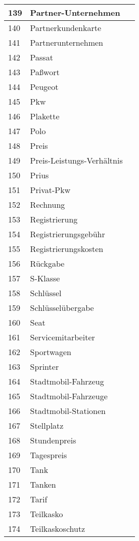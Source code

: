 \begin{longtable}{|m{1.5cm}|m{3cm}|m{8.5cm}|}
	\hline
	139 & Partner-Unternehmen & \\
	\hline
	140 & Partnerkundenkarte & \\
	\hline
	141 & Partnerunternehmen & \\
	\hline
	142 & Passat & \\
	\hline
	143 & Paßwort & \\
	\hline
	144 & Peugeot & \\
	\hline
	145 & Pkw & \\
	\hline
	146 & Plakette & \\
	\hline
	147 & Polo & \\
	\hline
	148 & Preis & \\
	\hline
	149 & Preis-Leistungs-Verhältnis & \\
	\hline
	150 & Prius & \\
	\hline
	151 & Privat-Pkw & \\
	\hline
	152 & Rechnung & \\
	\hline
	153 & Registrierung & \\
	\hline
	154 & Registrierungsgebühr & \\
	\hline
	155 & Registrierungskosten & \\
	\hline
	156 & Rückgabe & \\
	\hline
	157 & S-Klasse & \\
	\hline
	158 & Schlüssel & \\
	\hline
	159 & Schlüsselübergabe & \\
	\hline
	160 & Seat & \\
	\hline
	161 & Servicemitarbeiter & \\
	\hline
	162 & Sportwagen & \\
	\hline
	163 & Sprinter & \\
	\hline
	164 & Stadtmobil-Fahrzeug & \\
	\hline
	165 & Stadtmobil-Fahrzeuge & \\
	\hline
	166 & Stadtmobil-Stationen & \\
	\hline
	167 & Stellplatz & \\
	\hline
	168 & Stundenpreis & \\
	\hline
	169 & Tagespreis & \\
	\hline
	170 & Tank & \\
	\hline
	171 & Tanken & \\
	\hline
	172 & Tarif & \\
	\hline
	173 & Teilkasko & \\
	\hline
	174 & Teilkaskoschutz & \\

\end{longtable}
